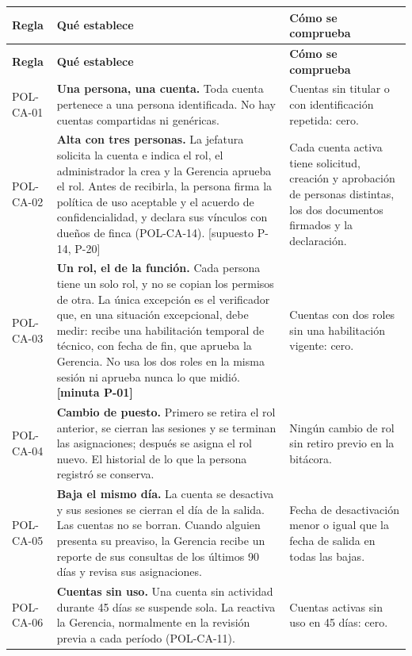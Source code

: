 \documentclass[11pt,letterpaper]{article}
\newcommand{\cab}[1]{\textbf{\rmfamily #1}}
\newcommand{\resp}[1]{\textrm{\footnotesize\bfseries [minuta #1]}}
\newcommand{\supu}[1]{\textrm{\footnotesize [supuesto #1]}}
\begin{document}
{\small
\renewcommand{\arraystretch}{1.14}
\begin{longtable}{@{}L{1.7cm} L{9.2cm} L{4.8cm}@{}}
\toprule
\cab{Regla} & \cab{Qué establece} & \cab{Cómo se comprueba} \\
\midrule
\endfirsthead
\toprule
\cab{Regla} & \cab{Qué establece} & \cab{Cómo se comprueba} \\
\midrule
\endhead
\bottomrule
\endfoot
POL-CA-01 & \textbf{Una persona, una cuenta.} Toda cuenta pertenece a una persona identificada. No hay cuentas compartidas ni genéricas. & Cuentas sin titular o con identificación repetida: cero. \\
POL-CA-02 & \textbf{Alta con tres personas.} La jefatura solicita la cuenta e indica el rol, el administrador la crea y la Gerencia aprueba el rol. Antes de recibirla, la persona firma la política de uso aceptable y el acuerdo de confidencialidad, y declara sus vínculos con dueños de finca (POL-CA-14). \supu{P-14, P-20} & Cada cuenta activa tiene solicitud, creación y aprobación de personas distintas, los dos documentos firmados y la declaración. \\
POL-CA-03 & \textbf{Un rol, el de la función.} Cada persona tiene un solo rol, y no se copian los permisos de otra. La única excepción es el verificador que, en una situación excepcional, debe medir: recibe una habilitación temporal de técnico, con fecha de fin, que aprueba la Gerencia. No usa los dos roles en la misma sesión ni aprueba nunca lo que midió. \resp{P-01} & Cuentas con dos roles sin una habilitación vigente: cero. \\
POL-CA-04 & \textbf{Cambio de puesto.} Primero se retira el rol anterior, se cierran las sesiones y se terminan las asignaciones; después se asigna el rol nuevo. El historial de lo que la persona registró se conserva. & Ningún cambio de rol sin retiro previo en la bitácora. \\
POL-CA-05 & \textbf{Baja el mismo día.} La cuenta se desactiva y sus sesiones se cierran el día de la salida. Las cuentas no se borran. Cuando alguien presenta su preaviso, la Gerencia recibe un reporte de sus consultas de los últimos 90 días y revisa sus asignaciones. & Fecha de desactivación menor o igual que la fecha de salida en todas las bajas. \\
POL-CA-06 & \textbf{Cuentas sin uso.} Una cuenta sin actividad durante 45 días se suspende sola. La reactiva la Gerencia, normalmente en la revisión previa a cada período (POL-CA-11). & Cuentas activas sin uso en 45 días: cero. \\

\end{longtable}}
\end{document}
